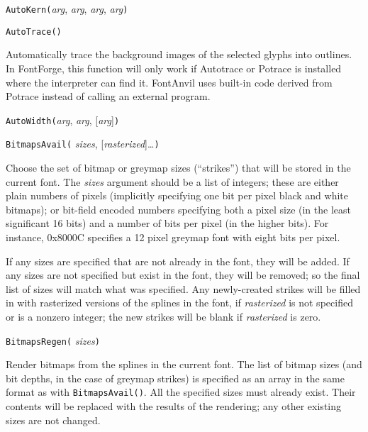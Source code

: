 
\texttt{AutoKern(}\textit{arg}, \textit{arg}, \textit{arg}, \textit{arg}\texttt{)}



\texttt{AutoTrace()}

Automatically trace the background images of the selected glyphs into
outlines.  \FFdiff In FontForge, this function will only work if Autotrace
or Potrace is installed where the interpreter can find it.  FontAnvil uses
built-in code derived from Potrace instead of calling an external program.



\texttt{AutoWidth(}\textit{arg}, \textit{arg}, [\textit{arg}]\texttt{)}



\texttt{BitmapsAvail(} \textit{sizes}, [\textit{rasterized}]\ldots\texttt{)}

Choose the set of bitmap or greymap sizes (``strikes'') that will be stored
in the current font.  The \textit{sizes} argument should be a list of
integers; these are either plain numbers of pixels (implicitly specifying
one bit per pixel black and white bitmaps); or bit-field encoded numbers
specifying both a pixel size (in the least significant 16 bits) and a number
of bits per pixel (in the higher bits).  For instance, 0x8000C specifies a
12 pixel greymap font with eight bits per pixel.

If any sizes are specified that are not already in the font, they will be
added.  If any sizes are not specified but exist in the font, they will be
removed; so the final list of sizes will match what was specified.  Any
newly-created strikes will be filled in with rasterized versions of the
splines in the font, if \textit{rasterized} is not specified or is a nonzero
integer; the new strikes will be blank if \textit{rasterized} is zero.



\texttt{BitmapsRegen(} \textit{sizes}\texttt{)}

Render bitmaps from the splines in the current font.  The list of bitmap
sizes (and bit depths, in the case of greymap strikes) is specified as an
array in the same format as with \texttt{BitmapsAvail()}.  All the specified
sizes must already exist.  Their contents will be replaced with the results
of the rendering; any other existing sizes are not changed.

